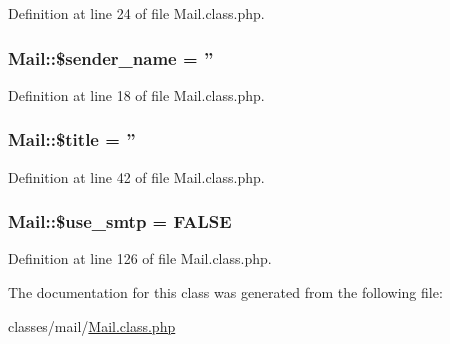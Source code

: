 Definition at line 24 of file Mail.\-class.\-php.

\hypertarget{classMail_a0ad6aa18dc8ea8c632bb7a82175e8d68}{
\subsubsection[{\$sender\-\_\-name}]{\setlength{\rightskip}{0pt plus 5cm}Mail\-::\$sender\-\_\-name = ''}}\label{classMail_a0ad6aa18dc8ea8c632bb7a82175e8d68}


Definition at line 18 of file Mail.\-class.\-php.

\hypertarget{classMail_aea1a8697c961d49a688564c5ca16cbcb}{
\subsubsection[{\$title}]{\setlength{\rightskip}{0pt plus 5cm}Mail\-::\$title = ''}}\label{classMail_aea1a8697c961d49a688564c5ca16cbcb}


Definition at line 42 of file Mail.\-class.\-php.

\hypertarget{classMail_a8fe39b2063dc112d7db67be074142628}{
\subsubsection[{\$use\-\_\-smtp}]{\setlength{\rightskip}{0pt plus 5cm}Mail\-::\$use\-\_\-smtp = F\-A\-L\-S\-E}}\label{classMail_a8fe39b2063dc112d7db67be074142628}


Definition at line 126 of file Mail.\-class.\-php.



The documentation for this class was generated from the following file\-:\begin{DoxyCompactItemize}
\item 
classes/mail/\hyperlink{Mail_8class_8php}{Mail.\-class.\-php}\end{DoxyCompactItemize}
